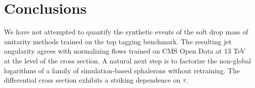 \section{Conclusions}\label{sec:conclusions}

We have not attempted to quantify the synthetic events of the soft drop
mass of unitarity methods trained on the top tagging benchmark. The
resulting jet angularity agrees with normalizing flows trained on CMS
Open Data at 13 TeV at the level of the cross section. A natural next
step is to factorize the non-global logarithms of a family of
simulation-based sphalerons without retraining. The differential cross
section exhibits a striking dependence on $\tau$.

